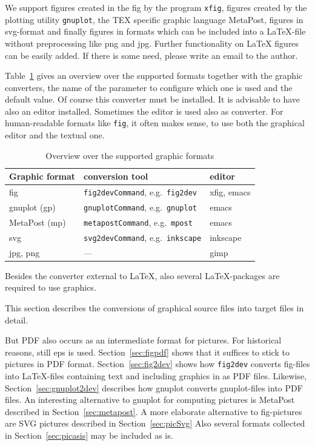 We support figures created in the \gls{fig} by the program \texttt{xfig}, 
figures created by the plotting utility \texttt{gnuplot}, 
the TEX specific graphic language MetaPost, 
figures in \gls{svg}-format 
and finally figures in formats which can be included into a \LaTeX-file 
without preprocessing like \gls{png} and \gls{jpg}. 
Further functionality on \LaTeX{} figures can be easily added. 
If there is some need, please write an email to the author. 

Table~\ref{tab:graphicOverview} gives an overview over the supported formats 
together with the graphic converters, 
the name of the parameter to configure which one is used 
and the default value. 
Of course this converter must be installed. 
It is advisable to have also an editor installed. 
Sometimes the editor is used also as converter. 
For human-readable formats like \texttt{fig}, it often makes sense, 
to use both the graphical editor and the textual one. 

\begin{longtable}{|l|ll|}
\toprule
Graphic format & conversion tool & editor \\
\midrule
\midrule
\endfirsthead%
\bottomrule
\caption{\label{tab:graphicOverview} 
Overview over the supported graphic formats }
\endlastfoot%
fig             & \texttt{fig2devCommand}, e.g.~\texttt{fig2dev}  & xfig, emacs   \\
gnuplot (gp)    & \texttt{gnuplotCommand}, e.g.~\texttt{gnuplot}  & emacs         \\
MetaPost (mp)   & \texttt{metapostCommand}, e.g.~\texttt{mpost}   & emacs         \\
svg             & \texttt{svg2devCommand}, e.g.~\texttt{inkscape} & inkscape      \\
jpg, png        & ---                                             & gimp          \\
\end{longtable}

Besides the converter external to \LaTeX, 
also several \LaTeX-packages are required 
to use graphics. 


This section describes the conversions of 
graphical source files into target files 
in detail. 

But PDF also occurs as an intermediate format for pictures. 
For historical reasons, still \gls{eps} is used. 
Section~\ref{sec:figpdf} shows that it suffices to stick to pictures 
in PDF format. 
Section~\ref{sec:fig2dev} shows how \texttt{fig2dev} converts fig-files 
into \LaTeX-files containing text and including graphics in as PDF files. 
Likewise, Section~\ref{sec:gnuplot2dev} describes 
how gnuplot converts gnuplot-files into PDF files. 
An interesting alternative to gnuplot for computing pictures 
is MetaPost described in Section~\ref{sec:metapost}. 
A more elaborate alternative to fig-pictures are SVG pictures 
described in Section~\ref{sec:picSvg}
Also several formats collected in Section~\ref{sec:picasis} 
may be included as is. 




